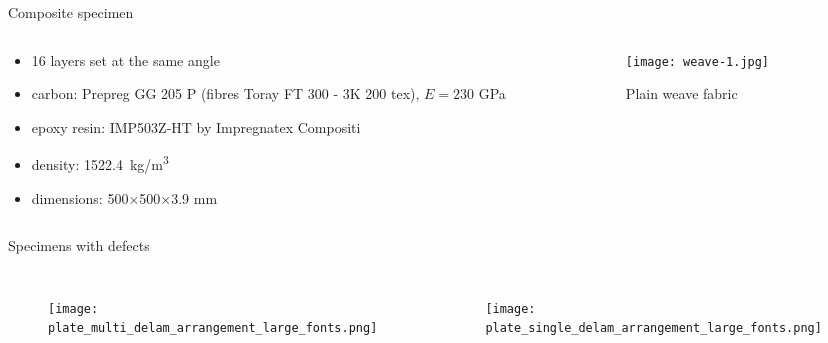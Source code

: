 \documentclass[10pt,aspectratio=169,dvipsnames]{beamer} %
\newcounter{angle}
\begin{document}
	\begin{frame}[t]{Composite specimen}
		\begin{columns}[T]
			\begin{column}[c]{0.6\textwidth}
					\begin{itemize}
						\item 16 layers set at the same angle 
						\item carbon: Prepreg GG 205 P (fibres Toray FT 300 - 3K 200 tex), $E=230$ GPa
						\item epoxy resin: IMP503Z-HT by Impregnatex Compositi 						
						\item density: 1522.4~kg/m\textsuperscript{3}
						\item dimensions: 500$\times$500$\times$3.9 mm
					\end{itemize}			
			\end{column}
			\begin{column}[c]{0.4\textwidth}
				\begin{figure}
					\centering
					\texttt{[image: weave-1.jpg]}
					\caption{Plain weave fabric}
				\end{figure}
			\end{column}			
		\end{columns}
	\end{frame}
	\begin{frame}[t]{Specimens with defects}
		\vspace{-0.5cm}
		\begin{columns}[T]
			\begin{figure}
				\texttt{[image: plate\_multi\_delam\_arrangement\_large\_fonts.png]}
			\end{figure}
			\begin{figure}
				\texttt{[image: plate\_single\_delam\_arrangement\_large\_fonts.png]}
			\end{figure}
		\end{columns}
	\end{frame}
\end{document}
